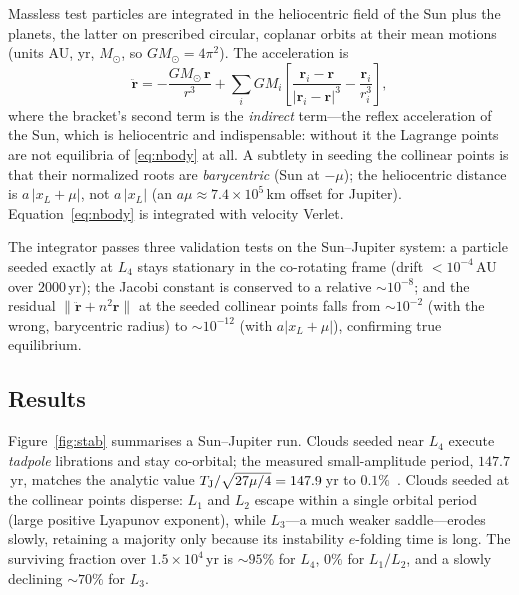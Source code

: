 \documentclass[10pt,twocolumn]{article}
\begin{document}
Massless test particles are integrated in the heliocentric field of the Sun plus
the planets, the latter on prescribed circular, coplanar orbits at their mean
motions (units AU, yr, $M_\odot$, so $GM_\odot=4\pi^2$). The acceleration is
\begin{equation}
  \ddot{\mathbf r} = -\frac{GM_\odot\,\mathbf r}{r^3}
   + \sum_i GM_i\!\left[\frac{\mathbf r_i-\mathbf r}{|\mathbf r_i-\mathbf r|^3}
   - \frac{\mathbf r_i}{r_i^3}\right],
  \label{eq:nbody}
\end{equation}
where the bracket's second term is the \emph{indirect} term---the reflex
acceleration of the Sun, which is heliocentric and indispensable: without it the
Lagrange points are not equilibria of \eqref{eq:nbody} at all. A subtlety in
seeding the collinear points is that their normalized roots are
\emph{barycentric} (Sun at $-\mu$); the heliocentric distance is
$a\,|x_L+\mu|$, not $a\,|x_L|$ (an $a\mu\approx7.4\times10^5$\,km offset for
Jupiter). Equation~\eqref{eq:nbody} is integrated with velocity Verlet.

The integrator passes three validation tests on the Sun--Jupiter system: a
particle seeded exactly at $L_4$ stays stationary in the co-rotating frame (drift
$<10^{-4}$\,AU over $2000$\,yr); the Jacobi constant is conserved to a relative
$\sim10^{-8}$; and the residual $\lVert\ddot{\mathbf r}+n^2\mathbf r\rVert$ at the
seeded collinear points falls from $\sim10^{-2}$ (with the wrong, barycentric
radius) to $\sim10^{-12}$ (with $a|x_L+\mu|$), confirming true equilibrium.

\subsection{Results}

Figure~\ref{fig:stab} summarises a Sun--Jupiter run. Clouds seeded near $L_4$
execute \emph{tadpole} librations and stay co-orbital; the measured
small-amplitude period, $147.7$\,yr, matches the analytic value
$T_{\rm J}/\sqrt{27\mu/4}=147.9$\,yr to $0.1\%$~\cite{murray1999}. Clouds seeded
at the collinear points disperse: $L_1$ and $L_2$ escape within a single orbital
period (large positive Lyapunov exponent), while $L_3$---a much weaker
saddle---erodes slowly, retaining a majority only because its instability
$e$-folding time is long. The surviving fraction over $1.5\times10^4$\,yr is
$\sim95\%$ for $L_4$, $0\%$ for $L_1/L_2$, and a slowly declining $\sim70\%$ for
$L_3$.
\end{document}
